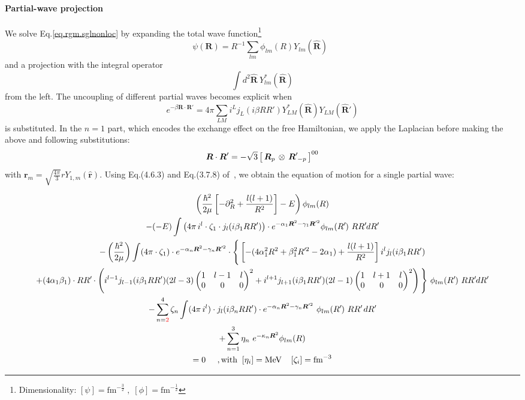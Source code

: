 \documentclass
[aps,nofootinbib,prl,showpacs,twocolumn,groupedaddress,superscriptaddress]
{revtex4}
\newcommand*{\mprime}{^{\prime}\mkern-1.2mu}
\newcommand{\red}[1]{\textcolor{red}{#1}}
\newcommand{\la}{\label}
\newcommand{\be}{\begin{equation}}
\newcommand{\ee}{\end{equation}}
\newcommand{\ve}[1]{\ensuremath{\boldsymbol{#1}}}
\newcommand{\coup}[3]{\left[\,#1\,\otimes\,#2\,\right]^{#3}}
\newcommand{\threej}[6]{ \begin{pmatrix}
   #1 & #2 & #3 \\
   #4 & #5 & #6 
  \end{pmatrix}}
\begin{document}
\paragraph{Partial-wave projection} We solve Eq.\eqref{eq.rgm.sglnonloc} by expanding
the total wave function\footnote{Dimensionality: $[\psi]=\text{fm}^{-\frac{3}{2}}\;,\;[\phi]=\text{fm}^{-\frac{1}{2}}$}
\be
\psi(\ve{R})=R^{-1}\sum_{lm}\phi_{lm}(R)Y_{lm}(\hat{\ve{R}})\;\;
\ee
and a projection with the integral operator
\be
\int d^2\hat{\ve{R}}~Y^*_{lm}(\hat{\ve{R}})
\ee
from the left. The uncoupling of different partial waves becomes explicit when
\be
e^{-\beta\ve{R}\cdot\ve{R}'}=4\pi\sum_{LM}i^Lj_L(i\beta RR')Y^*_{LM}(\hat{\ve{R}})Y_{LM}(\hat{\ve{R}}')
\ee
is substituted. In the $n=1$ part, which encodes the exchange effect on the free
Hamiltonian, we apply the Laplacian before making the above and following
substitutions:
\be
\ve{R}\cdot\ve{R}'=-\sqrt{3}\coup{\ve{R}_p}{\ve{R}\mprime_{-p}}{00}
\ee
with $\ve{r}_m=\sqrt{\frac{4\pi}{3}}rY_{1,m}(\hat{\ve{r}})$. Using Eq.(4.6.3) and
Eq.(3.7.8) of~\cite{Edmonds}, we obtain the equation of motion for a single
partial wave:
\begin{widetext}
\begin{subequations}\la{eq.rgm.sglnonloc.pw}
\begin{gather}
\left(\frac{\hbar^2}{2\mu}\left[-\partial^2_R+\frac{l(l+1)}{R^2}\right]-E\right)
\phi_{lm}(R)\\
-(-E)\int
\left(4\pi\,i^l\cdot\zeta_1\cdot j_l(i\beta_1 RR')\right)\cdot
 e^{-\alpha_1\ve{R}^2-\gamma_1\ve{R}'^2}\phi_{lm}(R\mprime)~RR\mprime dR\mprime
 \la{eq.rgm.sglnonloc.pw.Eex}\\
-\left(\frac{\hbar^2}{2\mu}\right)\int
(4\pi\cdot\zeta_1) \cdot e^{-\alpha_n\ve{R}^2-\gamma_n\ve{R}'^2}
\cdot\Bigg\lbrace
\left[-(4\alpha_1^2R^2+\beta_1^2R\mprime^2-2\alpha_1)+\frac{l(l+1)}{R^2}\right]
 i^l j_{l}(i\beta_1 RR')\nonumber\\
+(4\alpha_1\beta_1)\cdot RR\mprime\cdot
 \left(i^{l-1} j_{l-1}(i\beta_1 RR') (2l-3)
 \threej{1}{l-1}{l}{0}{0}{0}^2+
 i^{l+1} j_{l+1}(i\beta_1 RR') (2l-1)
 \threej{1}{l+1}{l}{0}{0}{0}^2\right)\Bigg\rbrace
~\phi_{lm}(R\mprime)~RR\mprime dR\mprime\la{eq.rgm.sglnonloc.pw.tex}\\
-\sum_{n=\red{2}}^4\zeta_n\int
(4\pi\,i^l)\cdot j_l(i\beta_n RR')\cdot 
e^{-\alpha_n\ve{R}^2-\gamma_n\ve{R}'^2}~\phi_{lm}(R\mprime)~RR\mprime\,dR\mprime\la{eq.rgm.sglnonloc.pw.noloc}\\
+\sum_{n=1}^3\eta_n~e^{-\kappa_n\ve{R}^2}\phi_{lm}(R)\la{eq.rgm.sglnonloc.pw.t}\\
 =0\;\;\;\;\;,\text{with}\;\;[\eta_i]=\text{MeV}\;\;\;\;[\zeta_i]=\text{fm}^{-3}\nonumber
\end{gather}
\end{subequations}
\end{widetext}
\end{document}
